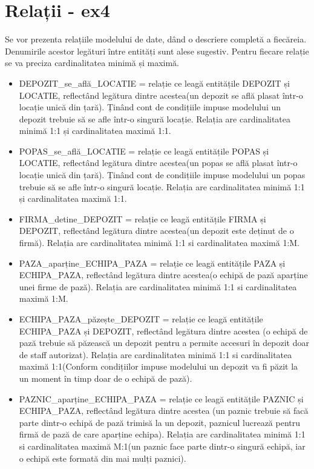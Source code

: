\documentclass[12pt, a4paper]{article}
\begin{document}
\section{Relații - ex4}
\quad\newline
Se vor prezenta relațiile modelului de date, dând o descriere completă a fiecăreia. Denumirile acestor legături între entități sunt alese sugestiv. Pentru fiecare relație se va preciza cardinalitatea minimă și maximă.
\begin{itemize}
    \item DEPOZIT\_se\_află\_LOCATIE = relație ce leagă entitățile DEPOZIT și LOCATIE, reflectând legătura dintre acestea(un depozit se află plasat într-o locație unică din țară). Ținând cont de condițiile impuse modelului un depozit trebuie să se afle într-o singură locație. Relația are cardinalitatea minimă 1:1 și cardinalitatea maximă 1:1.
    \item POPAS\_se\_află\_LOCATIE = relație ce leagă entitățile POPAS și  LOCATIE, reflectând legătura dintre acestea(un popas se află plasat într-o locație unică din țară). Ținând cont de condițiile impuse modelului un popas trebuie să se afle într-o singură locație. Relația are cardinalitatea minimă 1:1 și cardinalitatea maximă 1:1.
    \item FIRMA\_detine\_DEPOZIT = relație ce leagă entitățile FIRMA și DEPOZIT, reflectând legătura dintre acestea(un depozit este deținut de o firmă). Relația are cardinalitatea minimă 1:1 si cardinalitatea maximă 1:M.
    \item PAZA\_aparține\_ECHIPA\_PAZA = relație ce leagă entitățile PAZA și ECHIPA\_PAZA, reflectând legătura dintre acestea(o echipă de pază aparține unei firme de pază). Relația are cardinalitatea minimă 1:1 si cardinalitatea maximă 1:M.
    \item ECHIPA\_PAZA\_păzește\_DEPOZIT = relație ce leagă entitățile \\ECHIPA\_PAZA și DEPOZIT, reflectând legătura dintre acestea (o echipă de pază trebuie să păzească un depozit pentru a permite accesuri în depozit doar de staff autorizat). Relația are cardinalitatea minimă 1:1 si cardinalitatea maximă 1:1(Conform condițiilor impuse modelului un depozit va fi păzit la un moment în timp doar de o echipă de pază).
    \item PAZNIC\_aparține\_ECHIPA\_PAZA = relație ce leagă entitățile PAZNIC și ECHIPA\_PAZA, reflectând legătura dintre acestea (un paznic trebuie să facă parte dintr-o echipă de pază trimisă la un depozit, paznicul lucrează pentru firmă de pază de care aparține echipa). Relația are cardinalitatea minimă 1:1 si cardinalitatea maximă M:1(un paznic face parte dintr-o singură echipă, iar o echipă este formată din mai mulți paznici).

\end{itemize}
\end{document}
